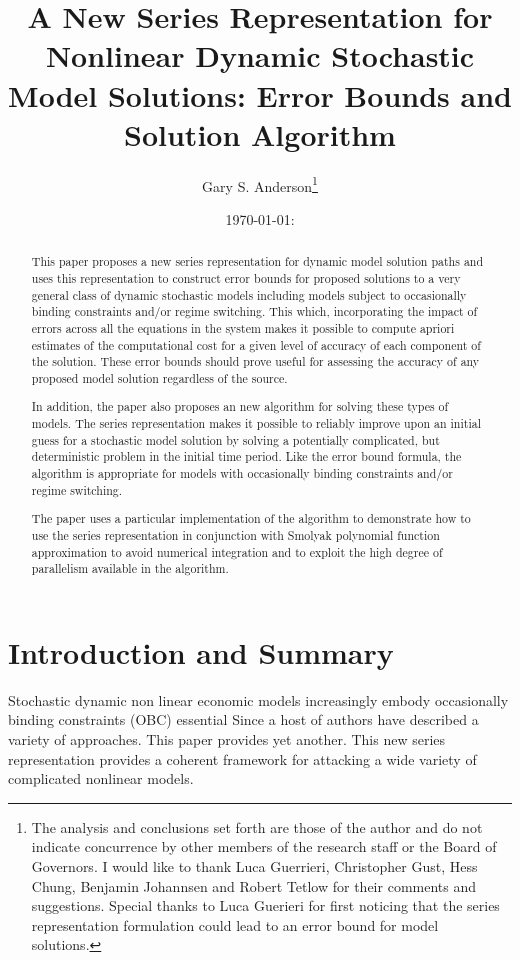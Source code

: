 \documentclass[12pt]{article}
\author{Gary S. Anderson\thanks{The analysis and conclusions set forth are those of the author and do not indicate concurrence by other members of the research staff or the Board of Governors. I would like to thank Luca Guerrieri, Christopher Gust, Hess Chung, Benjamin Johannsen  and Robert Tetlow for their comments and suggestions.  Special thanks to Luca Guerieri for first noticing that the series representation formulation could lead to an error bound for model solutions.}}
\title{A New Series Representation for 
Nonlinear Dynamic Stochastic Model Solutions: Error Bounds and Solution Algorithm}
\date{\today: \currenttime}
\begin{document}
\maketitle

\begin{abstract}
This paper proposes a new series representation for dynamic model solution paths and uses this representation to construct error bounds for proposed solutions to a very general class of dynamic stochastic models including models subject to occasionally binding constraints and/or regime switching.
This which, incorporating the impact of errors across  all the equations in 
the system makes it possible to compute
apriori estimates of the computational cost for a
given level of accuracy of each component of the solution.
These error bounds should prove useful for assessing the accuracy of any
proposed model solution regardless of the source.


In addition, the paper also proposes an new algorithm for solving these types of models.
The series representation makes it possible to reliably improve upon an initial
guess for a stochastic model solution by solving a 
potentially complicated, but deterministic problem in the initial time period.
Like the error bound formula, the algorithm is appropriate for models with occasionally binding constraints and/or regime switching. 


The  paper uses a particular implementation of the algorithm to
demonstrate how to use the 
series representation in conjunction with 
Smolyak polynomial function approximation to avoid numerical integration
and to exploit the high degree of parallelism available in the algorithm.







\end{abstract}

\newpage
\tableofcontents
\newpage

\section{Introduction and Summary}





Stochastic dynamic non linear economic
models increasingly embody  occasionally binding constraints (OBC) essential
Since \cite{Christiano2000} a host of
authors have described a variety of approaches. 
\cite{holden15:_exist_dsge,guerrieri15:_occbin,benigno09,hintermaier10,brumm10,nakov08,haefke98,nakata12,gordon11,billi11,Hintermaier2010,Guerrieri2015}
This paper provides yet another.  This new series representation provides  a coherent framework for attacking a wide variety of complicated nonlinear models.
\end{document}
